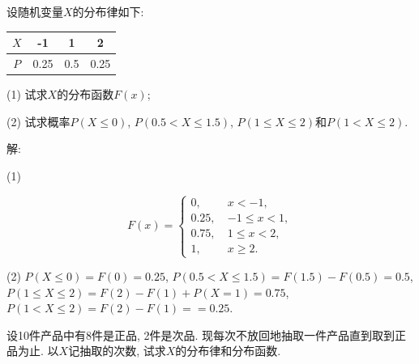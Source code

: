 \documentclass[standard]{ExBook}
\begin{document}
\begin{qitems}
\vspace{-5em}

    \begin{bbox}
    \begin{shaded}
        \qitem
设随机变量$X$的分布律如下: 
\begin{center}
\begin{tabular}{c|ccc}
$X$ & -1 & 1 & 2\\
\hline
$P$ & 0.25 & 0.5 & 0.25\\
\end{tabular}
\end{center}
(1) 试求$X$的分布函数$F(x)$;

(2) 试求概率$P(X \leq 0)$, $P(0.5 < X  \leq 1.5)$, $P(1 \leq X \leq 2)$和$P(1 < X \leq 2)$.
    \end{shaded}
    \end{bbox}

\vspace{-5em}

    \begin{bbox}
解: 

(1)
\vspace{-2em}
\begin{center}
\begin{equation}
    F(x)=
    \left\{
    \begin{array}{cl}
        \nonumber
        0,\ &x < -1,\\
        0.25,\ &-1 \leq x < 1,\\
        0.75,\ &1 \leq x < 2,\\
        1,\ &x \geq 2.
    \end{array}
    \right.
\end{equation}
\end{center}
(2) $P(X \leq 0)=F(0)=0.25$, $P(0.5 < X  \leq 1.5)=F(1.5)-F(0.5)=0.5$, $P(1 \leq X \leq 2)=F(2)-F(1)+P(X=1)=0.75$, $P(1 < X \leq 2)=F(2)-F(1)==0.25$.
    \end{bbox}

\vspace{-5em}

    \begin{bbox}
    \begin{shaded}
        \qitem
设10件产品中有8件是正品, 2件是次品. 现每次不放回地抽取一件产品直到取到正品为止. 以$X$记抽取的次数, 试求$X$的分布律和分布函数.
    \end{shaded}
    \end{bbox}

\vspace{-5em}


\end{qitems}
\end{document}
